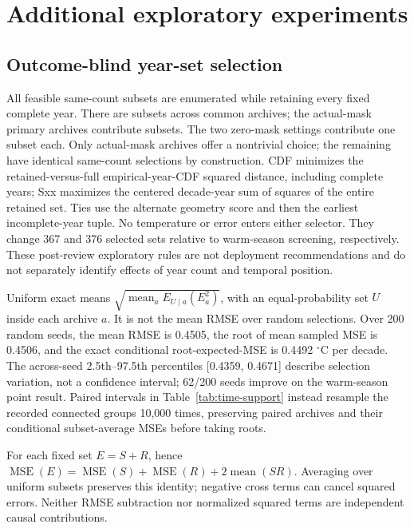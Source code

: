 \section{Additional exploratory experiments}

\subsection{Outcome-blind year-set selection}

All feasible same-count subsets are enumerated while retaining every fixed complete year. There are \PETimeSubsets{} subsets across \PETimeOriginalCommon{} common archives; the \PETimeN{} actual-mask primary archives contribute \PETimePrimarySubsets{} subsets. The two zero-mask settings contribute one subset each. Only \PETimeChoiceN{} actual-mask archives offer a nontrivial choice; the remaining \PETimeIdenticalN{} have identical same-count selections by construction. CDF minimizes the retained-versus-full empirical-year-CDF squared distance, including complete years; Sxx maximizes the centered decade-year sum of squares of the entire retained set. Ties use the alternate geometry score and then the earliest incomplete-year tuple. No temperature or error enters either selector. They change 367 and 376 selected sets relative to warm-season screening, respectively. These post-review exploratory rules are not deployment recommendations and do not separately identify effects of year count and temporal position.

Uniform exact means $\sqrt{\operatorname{mean}_{a}E_{U\mid a}(E_a^2)}$, with an equal-probability set $U$ inside each archive $a$. It is not the mean RMSE over random selections. Over 200 random seeds, the mean RMSE is 0.4505, the root of mean sampled MSE is 0.4506, and the exact conditional root-expected-MSE is 0.4492 $^{\circ}$C per decade. The across-seed 2.5th--97.5th percentiles [0.4359, 0.4671] describe selection variation, not a confidence interval; 62/200 seeds improve on the warm-season point result. Paired intervals in Table~\ref{tab:time-support} instead resample the recorded connected groups 10,000 times, preserving paired archives and their conditional subset-average MSEs before taking roots.

For each fixed set $E=S+R$, hence $\operatorname{MSE}(E)=\operatorname{MSE}(S)+\operatorname{MSE}(R)+2\operatorname{mean}(SR)$. Averaging over uniform subsets preserves this identity; negative cross terms can cancel squared errors. Neither RMSE subtraction nor normalized squared terms are independent causal contributions.


